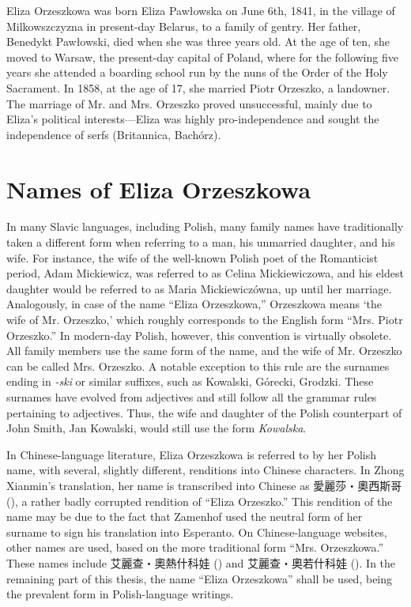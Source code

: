 Eliza Orzeszkowa was born Eliza Pawłowska on June 6th, 1841, in the village of Milkowszczyzna in present-day Belarus, to a family of gentry. Her father, Benedykt Pawłowski, died when she was three years old. 
At the age of ten, she moved to Warsaw, the present-day capital of Poland, where for the following five years she attended a boarding school run by the nuns of the Order of the Holy Sacrament.
In 1858, at the age of 17, she married Piotr Orzeszko, a landowner.
The marriage of Mr. and Mrs. Orzeszko proved unsuccessful, mainly due to Eliza's political interests---Eliza was highly pro-independence and sought the independence of serfs (Britannica, Bachórz).

\section{Names of Eliza Orzeszkowa}
In many Slavic languages, including Polish, many family names have traditionally taken a different form when referring to a man, his unmarried daughter, and his wife.
For instance, the wife of the well-known Polish poet of the Romanticist period, Adam Mickiewicz, was referred to as Celina Mickiewiczowa, and his eldest daughter would be referred to as Maria Mickiewiczówna, up until her marriage.
Analogously, in case of the name ``Eliza Orzeszkowa,'' Orzeszkowa means `the wife of Mr. Orzeszko,' which roughly corresponds to the English form ``Mrs. Piotr Orzeszko.''
In modern-day Polish, however, this convention is virtually obsolete.
All family members use the same form of the name, and the wife of Mr. Orzeszko can be called Mrs. Orzeszko.
A notable exception to this rule are the surnames ending in \textit{-ski} or similar suffixes, such as Kowalski, Górecki, Grodzki.
These surnames have evolved from adjectives and still follow all the grammar rules pertaining to adjectives.
Thus, the wife and daughter of the Polish counterpart of John Smith, Jan Kowalski, would still use the form \textit{Kowalska}. 

In Chinese-language literature, Eliza Orzeszkowa is referred to by her Polish name, with several, slightly different, renditions into Chinese characters.
In Zhong Xianmin's translation, her name is transcribed into Chinese as 愛麗莎・奧西斯哥 (), a rather badly corrupted rendition of ``Eliza Orzeszko.''
This rendition of the name may be due to the fact that Zamenhof used the neutral form of her surname to sign his translation into Esperanto.
On Chinese-language websites, other names are used, based on the more traditional form ``Mrs. Orzeszkowa.'' These names include 艾麗查・奧熱什科娃 () and 艾麗查・奧若什科娃 (). In the remaining part of this thesis, the name ``Eliza Orzeszkowa'' shall be used, being the prevalent form in Polish-language writings.

